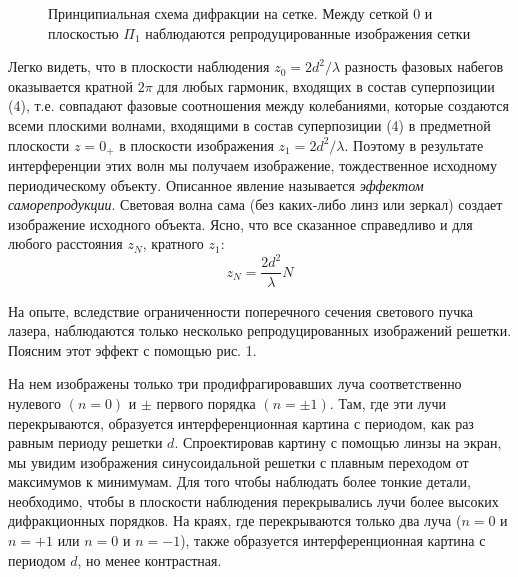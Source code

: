 \documentclass[14pt]{article}
\begin{document}
\begin{figure}[h!]
	\caption{Принципиальная схема дифракции на сетке. Между сеткой 0 и плоскостью $\Pi_1$ наблюдаются репродуцированные изображения сетки}
	\label{fig:image}
\end{figure}

\noindent Легко видеть, что в плоскости наблюдения $z_0 = 2d^2/\lambda$ разность фазовых набегов оказывается кратной $2\pi$ для любых гармоник,
входящих в состав суперпозиции (4), т.е. совпадают фазовые соотношения между колебаниями, которые создаются всеми плоскими волнами, входящими
в состав суперпозиции (4) в предметной плоскости $z = 0_+$ в плоскости изображения $z_1 = 2d^2/\lambda$. Поэтому в результате интерференции этих волн мы получаем изображение, тождественное исходному периодическому объекту. Описанное явление называется \textsl{эффектом саморепродукции}. Световая волна сама (без каких-либо 
линз или зеркал) создает изображение исходного объекта. Ясно, что все сказанное справедливо и для любого расстояния $z_N$, кратного $z_1$:
\begin{equation}
	z_N = \frac{2d^2}{\lambda}N
\end{equation}

На опыте, вследствие ограниченности поперечного сечения светового пучка лазера, наблюдаются только несколько репродуцированных изображений решетки. Поясним этот эффект с помощью рис. 1.

На нем изображены только три продифрагировавших луча соответственно нулевого $(n = 0)$ и $\pm$ первого порядка $(n = \pm1)$. Там, где эти лучи перекрываются, образуется интерференционная картина с периодом, как раз равным периоду решетки $d$. Спроектировав картину с помощью линзы на экран, мы увидим изображения синусоидальной решетки
с плавным переходом от максимумов к минимумам. Для того чтобы наблюдать более тонкие детали, необходимо, чтобы в плоскости наблюдения перекрывались лучи более высоких дифракционных порядков. На краях, где перекрываются только два луча ($n = 0$ и $n = +1$ или $n = 0$ и $n = −1$), также образуется интерференционная картина с периодом
$d$, но менее контрастная.
\end{document}
